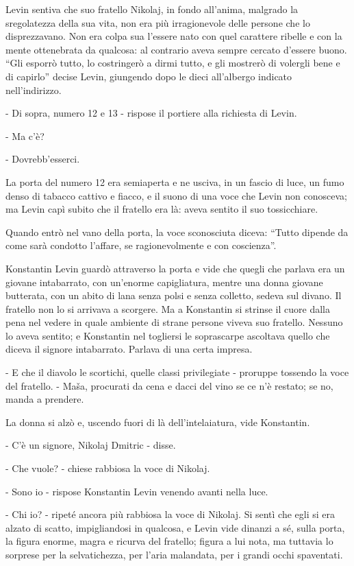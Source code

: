 Levin sentiva che suo fratello Nikolaj, in fondo all'anima, malgrado la sregolatezza della sua vita, non era più irragionevole delle persone che lo disprezzavano. Non era colpa sua l'essere nato con quel carattere ribelle e con la mente ottenebrata da qualcosa: al contrario aveva sempre cercato d'essere buono. ``Gli esporrò tutto, lo costringerò a dirmi tutto, e gli mostrerò di volergli bene e di capirlo'' decise Levin, giungendo dopo le dieci all'albergo indicato nell'indirizzo. 

- Di sopra, numero 12 e 13 - rispose il portiere alla richiesta di Levin. 

- Ma c'è? 

- Dovrebb'esserci. 

La porta del numero 12 era semiaperta e ne usciva, in un fascio di luce, un fumo denso di tabacco cattivo e fiacco, e il suono di una voce che Levin non conosceva; ma Levin capì subito che il fratello era là: aveva sentito il suo tossicchiare. 

Quando entrò nel vano della porta, la voce sconosciuta diceva: ``Tutto dipende da come sarà condotto l'affare, se ragionevolmente e con coscienza''. 

Konstantin Levin guardò attraverso la porta e vide che quegli che parlava era un giovane intabarrato, con un'enorme capigliatura, mentre una donna giovane butterata, con un abito di lana senza polsi e senza colletto, sedeva sul divano. Il fratello non lo si arrivava a scorgere. Ma a Konstantin si strinse il cuore dalla pena nel vedere in quale ambiente di strane persone viveva suo fratello. Nessuno lo aveva sentito; e Konstantin nel togliersi le soprascarpe ascoltava quello che diceva il signore intabarrato. Parlava di una certa impresa. 

- E che il diavolo le scortichi, quelle classi privilegiate - proruppe tossendo la voce del fratello. - Maša, procurati da cena e dacci del vino se ce n'è restato; se no, manda a prendere. 

La donna si alzò e, uscendo fuori di là dell'intelaiatura, vide Konstantin. 

- C'è un signore, Nikolaj Dmitric - disse. 

- Che vuole? - chiese rabbiosa la voce di Nikolaj. 

- Sono io - rispose Konstantin Levin venendo avanti nella luce. 

- Chi io? - ripeté ancora più rabbiosa la voce di Nikolaj. Si sentì che egli si era alzato di scatto, impigliandosi in qualcosa, e Levin vide dinanzi a sé, sulla porta, la figura enorme, magra e ricurva del fratello; figura a lui nota, ma tuttavia lo sorprese per la selvatichezza, per l'aria malandata, per i grandi occhi spaventati. 

